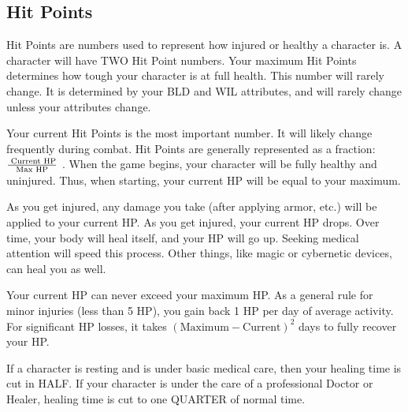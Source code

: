 \documentclass[twoside]{book}
\begin{document}
    

\subsection{Hit Points}
    
    {  
     Hit Points are numbers used to represent how injured
               or healthy a character is. A character will have TWO Hit
               Point numbers. Your maximum Hit Points determines how
               tough your character is at full health. This number will
               rarely change. It is determined by your BLD and WIL
               attributes, and will rarely change unless your attributes
               change. 
    }
  
    {  
     Your current Hit Points is the most important number.
              It will likely change frequently during combat. Hit Points
              are generally represented as a fraction: \begin{math}{{\textrm{
              Current HP}}\over{\textrm{Max HP}}}\end{math} . When the
              game begins, your character will be fully healthy and
              uninjured. Thus, when starting, your current HP will be
              equal to your maximum.
            
    }
  
    {  
     As you get injured, any damage you take (after
               applying armor, etc.) will be applied to your current HP.
               As you get injured, your current HP drops. Over time, your
               body will heal itself, and your HP will go up. Seeking
               medical attention will speed this process. Other things,
               like magic or cybernetic devices, can heal you as well.
               
    }
  
    {  
     Your current HP can never exceed your maximum HP. As
               a general rule for minor injuries (less than 5 HP), you
               gain back 1 HP per day of average activity. For
               significant HP losses, it takes \begin{math}  
                    {   (   \textrm{Maximum} 
                      -   \textrm{Current}   )  
                     }^{ 2 }    \end{math}  days to fully recover your HP.
            
    }
  
    {  
     If a character is resting and is under basic medical
               care, then your healing time is cut in HALF. If your
               character is under the care of a professional Doctor or
               Healer, healing time is cut to one QUARTER of normal time.
               
    }
  
\end{document}
